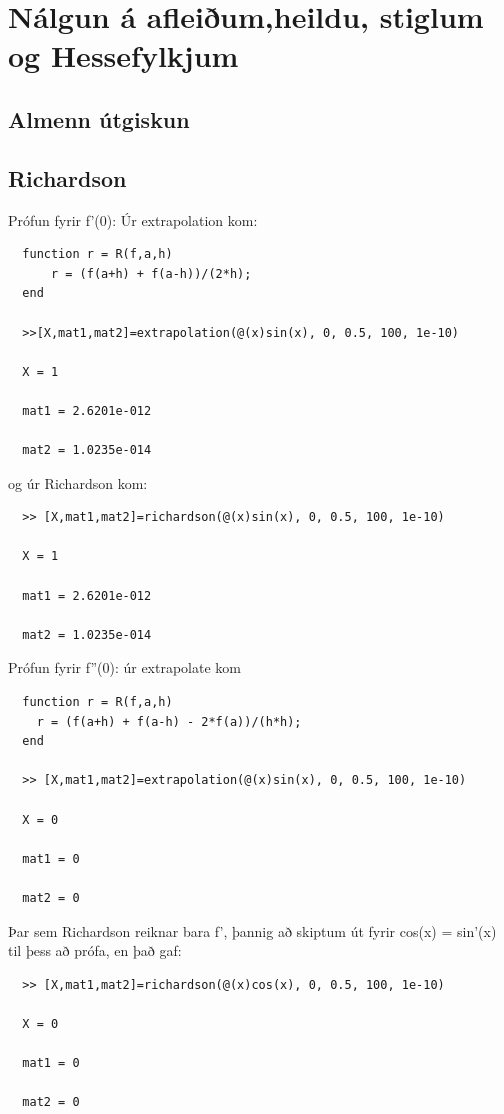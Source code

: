 \documentclass[a4]{article}
\begin{document}
\section{Nálgun á afleiðum,heildu, stiglum og Hessefylkjum}
\subsection{Almenn útgiskun}


\subsection{Richardson}
Prófun fyrir f'(0):
Úr extrapolation kom:
\begin{lstlisting}
  function r = R(f,a,h)
      r = (f(a+h) + f(a-h))/(2*h);
  end

  >>[X,mat1,mat2]=extrapolation(@(x)sin(x), 0, 0.5, 100, 1e-10)

  X = 1 

  mat1 = 2.6201e-012

  mat2 = 1.0235e-014 
\end{lstlisting}

og úr Richardson kom:
\begin{lstlisting}
  >> [X,mat1,mat2]=richardson(@(x)sin(x), 0, 0.5, 100, 1e-10)

  X = 1

  mat1 = 2.6201e-012

  mat2 = 1.0235e-014
\end{lstlisting}
Prófun fyrir f''(0):
úr extrapolate kom
\begin{lstlisting}
  function r = R(f,a,h)
    r = (f(a+h) + f(a-h) - 2*f(a))/(h*h);
  end

  >> [X,mat1,mat2]=extrapolation(@(x)sin(x), 0, 0.5, 100, 1e-10)

  X = 0

  mat1 = 0

  mat2 = 0
\end{lstlisting}

Þar sem Richardson reiknar bara f', þannig að skiptum út fyrir cos(x) = sin'(x) til þess að prófa, en það gaf:
\begin{lstlisting}
  >> [X,mat1,mat2]=richardson(@(x)cos(x), 0, 0.5, 100, 1e-10)

  X = 0

  mat1 = 0

  mat2 = 0
\end{lstlisting}
\end{document}
